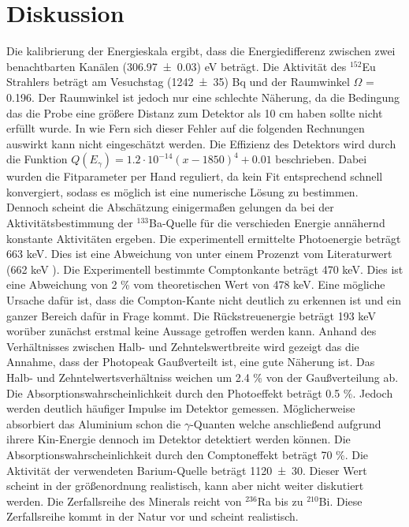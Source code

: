 \section{Diskussion}
\label{sec:Diskussion}
Die kalibrierung der Energieskala ergibt, dass die Energiedifferenz zwischen zwei benachtbarten Kanälen (\num{306.97 +- 0.03}) eV beträgt. Die Aktivität des $^{152}$Eu Strahlers beträgt am Vesuchstag (\num{1242 +- 35}) Bq und der Raumwinkel $\Omega$ = 0.196. Der Raumwinkel ist jedoch nur eine schlechte Näherung, da die Bedingung das die Probe eine größere Distanz zum Detektor als 10 cm haben sollte nicht erfüllt wurde. In wie Fern sich dieser Fehler auf die folgenden Rechnungen auswirkt kann nicht eingeschätzt werden. Die Effizienz des Detektors wird durch die Funktion $Q(E_\gamma) = 1.2 \cdot 10^{-14} (x-1850)^4 +0.01$ beschrieben. Dabei wurden die Fitparameter per Hand reguliert, da kein Fit entsprechend schnell konvergiert, sodass es möglich ist eine numerische Lösung zu bestimmen. Dennoch scheint die Abschätzung einigermaßen gelungen da bei der Aktivitätsbestimmung der $^{133}$Ba-Quelle für die verschieden Energie annähernd konstante Aktivitäten ergeben. Die experimentell ermittelte Photoenergie beträgt 663 keV. Dies ist eine Abweichung von unter einem Prozenzt vom Literaturwert (662 keV \cite{Cs}). Die Experimentell bestimmte Comptonkante beträgt 470 keV. Dies ist eine Abweichung von 2 \% vom theoretischen Wert von 478 keV. Eine mögliche Ursache dafür ist, dass die Compton-Kante nicht deutlich zu erkennen ist und ein ganzer Bereich dafür in Frage kommt. Die Rückstreuenergie beträgt 193 keV worüber zunächst erstmal keine Aussage getroffen werden kann. Anhand des Verhältnisses zwischen Halb- und Zehntelswertbreite wird gezeigt das die Annahme, dass der Photopeak Gaußverteilt ist, eine gute Näherung ist. Das Halb- und Zehntelwertsverhältniss weichen um 2.4 \% von der Gaußverteilung ab. Die Absorptionswahrscheinlichkeit durch den Photoeffekt beträgt 0.5 \%. Jedoch werden deutlich häufiger Impulse im Detektor gemessen. Möglicherweise absorbiert das Aluminium schon die $\gamma$-Quanten welche anschließend aufgrund ihrere Kin-Energie dennoch im Detektor detektiert werden können. Die Absorptionswahrscheinlichkeit durch den Comptoneffekt beträgt 70 \%. Die Aktivität der verwendeten Barium-Quelle beträgt \num{1120 +- 30}. Dieser Wert scheint in der größenordnung realistisch, kann aber nicht weiter diskutiert werden. Die Zerfallsreihe des Minerals reicht von $^{236}$Ra bis zu $^{210}$Bi. Diese Zerfallsreihe kommt in der Natur vor und scheint realistisch.
